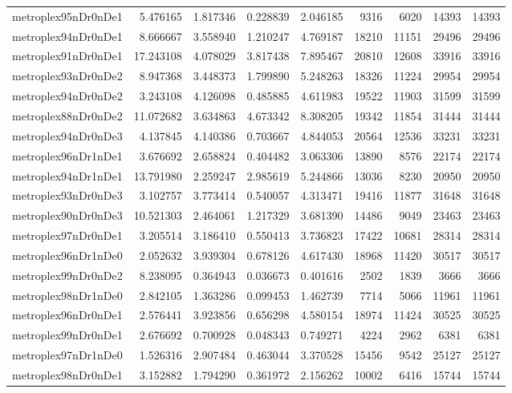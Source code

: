 \begin{longtable}{|l|r|r|r|r|r|r|r|r|}
metroplex95nDr0nDe1 & 5.476165 & 1.817346 & 0.228839 & 2.046185 & 9316 & 6020 & 14393 & 14393 \\
metroplex94nDr0nDe1 & 8.666667 & 3.558940 & 1.210247 & 4.769187 & 18210 & 11151 & 29496 & 29496 \\
metroplex91nDr0nDe1 & 17.243108 & 4.078029 & 3.817438 & 7.895467 & 20810 & 12608 & 33916 & 33916 \\
metroplex93nDr0nDe2 & 8.947368 & 3.448373 & 1.799890 & 5.248263 & 18326 & 11224 & 29954 & 29954 \\
metroplex94nDr0nDe2 & 3.243108 & 4.126098 & 0.485885 & 4.611983 & 19522 & 11903 & 31599 & 31599 \\
metroplex88nDr0nDe2 & 11.072682 & 3.634863 & 4.673342 & 8.308205 & 19342 & 11854 & 31444 & 31444 \\
metroplex94nDr0nDe3 & 4.137845 & 4.140386 & 0.703667 & 4.844053 & 20564 & 12536 & 33231 & 33231 \\
metroplex96nDr1nDe1 & 3.676692 & 2.658824 & 0.404482 & 3.063306 & 13890 & 8576 & 22174 & 22174 \\
metroplex94nDr1nDe1 & 13.791980 & 2.259247 & 2.985619 & 5.244866 & 13036 & 8230 & 20950 & 20950 \\
metroplex93nDr0nDe3 & 3.102757 & 3.773414 & 0.540057 & 4.313471 & 19416 & 11877 & 31648 & 31648 \\
metroplex90nDr0nDe3 & 10.521303 & 2.464061 & 1.217329 & 3.681390 & 14486 & 9049 & 23463 & 23463 \\
metroplex97nDr0nDe1 & 3.205514 & 3.186410 & 0.550413 & 3.736823 & 17422 & 10681 & 28314 & 28314 \\
metroplex96nDr1nDe0 & 2.052632 & 3.939304 & 0.678126 & 4.617430 & 18968 & 11420 & 30517 & 30517 \\
metroplex99nDr0nDe2 & 8.238095 & 0.364943 & 0.036673 & 0.401616 & 2502 & 1839 & 3666 & 3666 \\
metroplex98nDr1nDe0 & 2.842105 & 1.363286 & 0.099453 & 1.462739 & 7714 & 5066 & 11961 & 11961 \\
metroplex96nDr0nDe1 & 2.576441 & 3.923856 & 0.656298 & 4.580154 & 18974 & 11424 & 30525 & 30525 \\
metroplex99nDr0nDe1 & 2.676692 & 0.700928 & 0.048343 & 0.749271 & 4224 & 2962 & 6381 & 6381 \\
metroplex97nDr1nDe0 & 1.526316 & 2.907484 & 0.463044 & 3.370528 & 15456 & 9542 & 25127 & 25127 \\
metroplex98nDr0nDe1 & 3.152882 & 1.794290 & 0.361972 & 2.156262 & 10002 & 6416 & 15744 & 15744 \\

\end{longtable}
